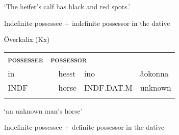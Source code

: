 \begin{styleTranslation}
‘The heifer’s calf has black and red spots.’

\end{styleTranslation}


\begin{listWWNumxiileveli}
\item 

\begin{styleListii}
Indefinite possessee + indefinite possessor in the dative

\end{styleListii}

\end{listWWNumxiileveli}

\begin{listWWNumileveli}
\item 

\begin{styleExample}
Överkalix (Kx)

\end{styleExample}

\end{listWWNumileveli}

\begin{tabular}{llllll}
\lsptoprule
{\bfseries\scshape possessee} & \multicolumn{4}{l}{{\bfseries\scshape possessor}

} & \\
\multicolumn{2}{l}{in

} & hesst & ino & \multicolumn{2}{l}{åokonna

}\\
\multicolumn{2}{l}{INDF

} & horse & INDF.DAT.M & \multicolumn{2}{l}{unknown

}\\
\lspbottomrule
\end{tabular}

\begin{styleTranslation}
 ‘an unknown man’s horse’

\end{styleTranslation}


\begin{listWWNumxiileveli}
\item 

\begin{styleListii}
Indefinite possessee + definite possessor in the dative

\end{styleListii}

\end{listWWNumxiileveli}

